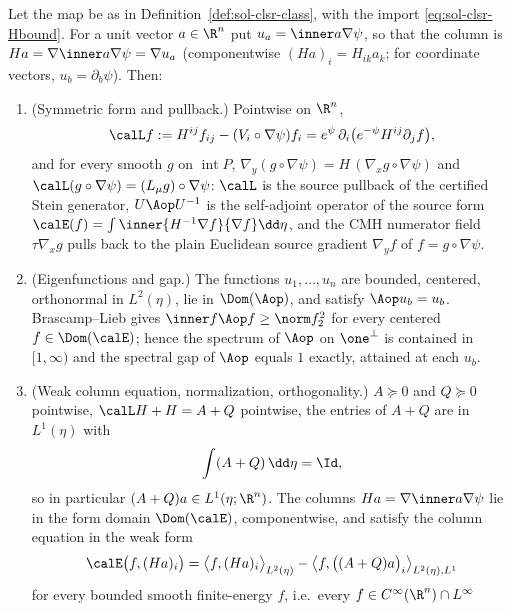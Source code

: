 \documentclass[../main.tex]{subfiles}
\begin{document}
\begin{theorem}
\label{thm:sol-clsr-main}
Let the map be as in Definition~\ref{def:sol-clsr-class}, with the import
\eqref{eq:sol-clsr-Hbound}.  For a unit vector $a\in\R^n$ put
$u_a=\inner a{\nabla\psi}$, so that the column is $Ha=\nabla\inner a{\nabla\psi}=\nabla u_a$
(componentwise $(Ha)_i=H_{ik}a_k$; for coordinate vectors, $u_b=\partial_b\psi$).  Then:
\begin{enumerate}[label=(\alph*),leftmargin=2.2em]
\item\label{it:sol-clsr-a} \textup{(Symmetric form and pullback.)}  Pointwise on $\R^n$,
\[
  \calL f:=H^{ij}f_{ij}-(V_i\circ\nabla\psi)f_i
  =e^{\psi}\,\partial_i\bigl(e^{-\psi}H^{ij}\partial_jf\bigr),
\]
and for every smooth $g$ on $\operatorname{int}P$,
$\nabla_y(g\circ\nabla\psi)=H\,(\nabla_xg\circ\nabla\psi)$ and
$\calL(g\circ\nabla\psi)=(L_\mu g)\circ\nabla\psi$: $\calL$ is the source pullback of the
certified Stein generator, $U\Aop U^{-1}$ is the self-adjoint operator of the source form
$\calE(f)=\int\inner{H^{-1}\nabla f}{\nabla f}\dd\eta$, and the CMH numerator field
$\tau\nabla_xg$ pulls back to the plain Euclidean source gradient $\nabla_yf$ of
$f=g\circ\nabla\psi$.
\item\label{it:sol-clsr-b} \textup{(Eigenfunctions and gap.)}  The functions
$u_1,\dots,u_n$ are bounded, centered, orthonormal in $L^2(\eta)$, lie in $\Dom(\Aop)$, and
satisfy $\Aop u_b=u_b$.  Brascamp--Lieb gives $\inner f{\Aop f}\ge\norm f_2^2$ for every
centered $f\in\Dom(\calE)$; hence the spectrum of $\Aop$ on $\one^\perp$ is contained in
$[1,\infty)$ and the spectral gap of $\Aop$ equals $1$ exactly, attained at each $u_b$.
\item\label{it:sol-clsr-c} \textup{(Weak column equation, normalization, orthogonality.)}
$A\succeq0$ and $Q\succeq0$ pointwise, $\calL H+H=A+Q$ pointwise, the entries of $A+Q$ are in
$L^1(\eta)$ with
\[
  \int(A+Q)\,\dd\eta=\Id ,
\]
so in particular $(A+Q)a\in L^1(\eta;\R^n)$.  The columns $Ha=\nabla\inner a{\nabla\psi}$
lie in the form domain $\Dom(\calE)$, componentwise, and satisfy the column equation in the
weak form
\begin{equation}
  \calE\bigl(f,(Ha)_i\bigr)
  =\bigl\langle f,(Ha)_i\bigr\rangle_{L^2(\eta)}
   -\bigl\langle f,\bigl((A+Q)a\bigr)_i\bigr\rangle_{L^2(\eta),L^1}
  \label{eq:sol-clsr-weak-column}
\end{equation}
for every bounded smooth finite-energy $f$, i.e.\ every $f\in C^\infty(\R^n)\cap L^\infty$

\end{enumerate}
\end{theorem}
\end{document}
